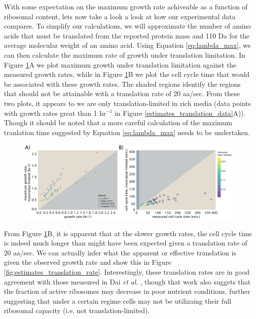 \documentclass[11pt, letterpaper]{article}
\begin{document}
With some expectation on the maximum growth rate achiveable as a function of
ribosomal content, lets now take a look a look at how our experimental data
compares. To simplify our calculations, we will approximate the number of amino
acids that must be translated from the reported protein mass and 110 Da for the
average molecular weight of an amino acid. Using Equation \ref{eq:lambda_max},
we can then calculate the maximum rate of growth under translation limitation.
In Figure \ref{fig:estimates_translation_data}A we plot maximum growth under translation limitation against
the measured growth rates, while in Figure \ref{fig:estimates_translation_data}B we plot the cell cycle time
that would be associated with these growth rates. The shaded regions identify
the regions that should not be attainable with a translation rate of 20 aa/sec.
From these two plots, it appears to we are only translation-limited
in rich media (data points with growth rates great than 1 hr$^{-1}$ in Figure \ref{estimates_translation_data}A)).
Though it should be noted that a more careful  calculation of the maximum
tranlation time suggested by Equation \ref{eq:lambda_max} needs to be
undertaken.

\begin{figure}[H]
		\centering
    \includegraphics[width=1\textwidth]{../../code/figures/SI/estimates_translation_data.pdf}
  \caption{}
  \label{fig:estimates_translation_data}
\end{figure}


From Figure \ref{fig:estimates_translation_data}B, it is apparent that at the
slower growth rates, the cell cycle time is indeed much longer than might have
been expected given a translation rate of 20 aa/sec. We can actually infer what
the apparent or effective translation is given the observed growth rate and show
this in Figure \ref{fig:estimates_translation_rate}.  Interestingly, these
translation rates are in good agreement with those measured in Dai {\it et al.} \cite{Dai2016},
though that work also suggets that the fraction of active ribosomes may decrease
in poor nutrient conditions, further suggesting that under a certain regime
cells may not be utilizaing their full ribosomal capacity (i.e. not
translation-limited).
\end{document}
